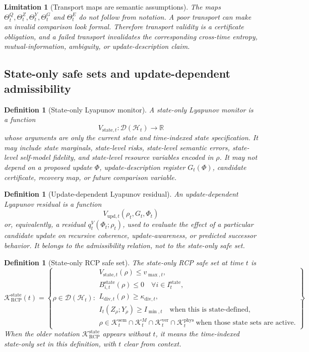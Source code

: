 \documentclass[11pt]{article}
\newtheorem{definition}[theorem]{Definition}
\newtheorem{limitation}[theorem]{Limitation}
\newcommand{\D}{\mathcal{D}}
\newcommand{\Hcal}{\mathcal{H}}
\newcommand{\K}{\mathcal{K}}
\newcommand{\1}{\mathbf{1}}
\newcommand{\RCP}{\mathrm{RCP}}
\newcommand{\diver}{\mathrm{div}}
\newcommand{\state}{\mathrm{state}}
\providecommand{\sem}{\mathrm{sem}}
\providecommand{\phys}{\mathrm{phys}}
\providecommand{\ver}{\mathrm{ver}}
\providecommand{\upd}{\mathrm{upd}}
\begin{document}
\begin{limitation}[Transport maps are semantic assumptions]
The maps \(\Theta_t^Q,\Theta_t^Z,\Theta_t^Y,\Theta_t^G\) and \(\Theta_t^E\) do not follow from notation. A poor transport can make an invalid comparison look formal. Therefore transport validity is a certificate obligation, and a failed transport invalidates the corresponding cross-time entropy, mutual-information, ambiguity, or update-description claim.
\end{limitation}

\subsection{State-only safe sets and update-dependent admissibility}

\begin{definition}[State-only Lyapunov monitor]
\label{def:state_only_lyapunov_monitor}
A state-only Lyapunov monitor is a function
\[
V_{\state,t}:\D(\Hcal_t)\to\mathbb R
\]
whose arguments are only the current state and time-indexed state specification. It may include state marginals, state-level risks, state-level semantic errors, state-level self-model fidelity, and state-level resource variables encoded in \(\rho\). It may not depend on a proposed update \(\Phi\), update-description register \(G_t(\Phi)\), candidate certificate, recovery map, or future comparison variable.
\end{definition}

\begin{definition}[Update-dependent Lyapunov residual]
\label{def:update_dependent_lyapunov_residual}
An update-dependent Lyapunov residual is a function
\[
V_{\upd,t}(\rho_t,G_t,\Phi_t)
\]
or, equivalently, a residual \(q_t^V(\Phi_t;\rho_t)\), used to evaluate the effect of a particular candidate update on recursive coherence, update-awareness, or predicted successor behavior. It belongs to the admissibility relation, not to the state-only safe set.
\end{definition}

\begin{definition}[State-only RCP safe set]
\label{def:state_only_rcp_safe_set_batch8}
The state-only RCP safe set at time \(t\) is
\[
\K_{\RCP}^{\state}(t)
=
\left\{
\rho\in\D(\Hcal_t):
\begin{array}{l}
V_{\state,t}(\rho)\le v_{\max,t},\\
B_{i,t}^{\state}(\rho)\le0\quad\forall i\in I_t^{\state},\\
L_{\diver,t}(\rho)\ge\kappa_{\diver,t},\\
I_t(Z_\rho;Y_\rho)\ge I_{\min,t}\quad\text{when this is state-defined},\\
\rho\in\K_t^{\sem}\cap\K_t^{M}\cap\K_t^{\ver}\cap\K_t^{\phys}\ \text{when those state sets are active.}
\end{array}
\right\}.
\]
When the older notation \(\K_{\RCP}^{\state}\) appears without \(t\), it means the time-indexed state-only set in this definition, with \(t\) clear from context.
\end{definition}
\end{document}
